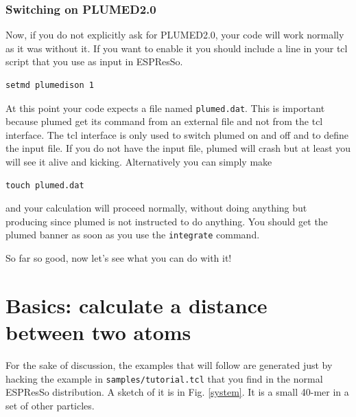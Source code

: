 \documentclass[10pt,fleqn,a4paper]{report}
\begin{document}
\subsection{Switching on PLUMED2.0}
Now, if you do not explicitly ask for PLUMED2.0, your code will work normally as it was without it.
If you want to enable it you should include a line in your tcl script that you use as input in ESPResSo.
\begin{verbatim}
setmd plumedison 1
\end{verbatim}
At this point your code expects a file named \texttt{plumed.dat}. 
This is important because plumed get its command from an external file and not from the tcl interface. The tcl interface is only used to switch plumed on and off and to define the input file.
If you do not have the input file, plumed
will crash but at least you will see it alive and kicking. 
Alternatively you can simply make 
\begin{verbatim}
touch plumed.dat
\end{verbatim}
and your calculation will proceed normally, without doing anything but producing since plumed 
is not instructed to do anything. You should get 
the plumed banner as soon as you use the \texttt{integrate} command.


So far so good, now let's see what you can do with it!

\chapter{Basics: calculate a distance between two atoms}

For the sake of discussion, the examples that will follow are generated just by hacking 
the example in \texttt{samples/tutorial.tcl} that you find in the normal ESPResSo distribution.
A sketch of it is in Fig. \ref{system}. It is a small 40-mer in a set of other particles.
\end{document}
